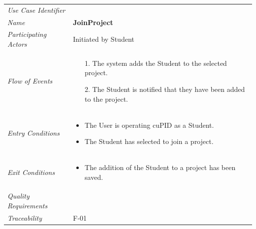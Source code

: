 \documentclass[12pt,letterpaper]{article}
\begin{document}
\begin{center}
	\begin{tabu} to 
		\toprule
		Use Case Identifier & \joinproject{} \\
		Name & {\bf JoinProject} \\
		Participating Actors & Initiated by Student \\
		Flow of Events & 
		\begin{minipage}[t]{\linewidth}
		    \begin{enumerate}
			    	\item[1.] The system adds the Student to the selected project.
			    	\item[2.] The Student is notified that they have been added to the project.
			\end{enumerate}
		\end{minipage} \\

		Entry Conditions &
		\begin{minipage}[t]{\linewidth}
			\begin{itemize}
			    \item The User is operating cuPID as a Student.
			    \item The Student has selected to join a project.
	        \end{itemize}
		\end{minipage} \\

		Exit Conditions &
		\begin{minipage}[t]{\linewidth}
			\begin{itemize}
			    \item The addition of the Student to a project has been saved.
	        \end{itemize}
		\end{minipage} \\

		Quality Requirements & \\

		Traceability & F-01 \\
		\toprule
	\end{tabu}
\end{center}
\end{document}
